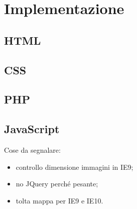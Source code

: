 \section{Implementazione}
\label{implementazione}

\subsection{HTML}
\label{implementazione-HTML}

\subsection{CSS}
\label{implementazione-CSS}

\subsection{PHP}
\label{implementazione-PHP}

\subsection{JavaScript}
\label{implementazione-JavaScript}
Cose da segnalare:
\begin{itemize}
	\item controllo dimensione immagini in IE9;
	\item no JQuery perché pesante;
	\item tolta mappa per IE9 e IE10.
\end{itemize}